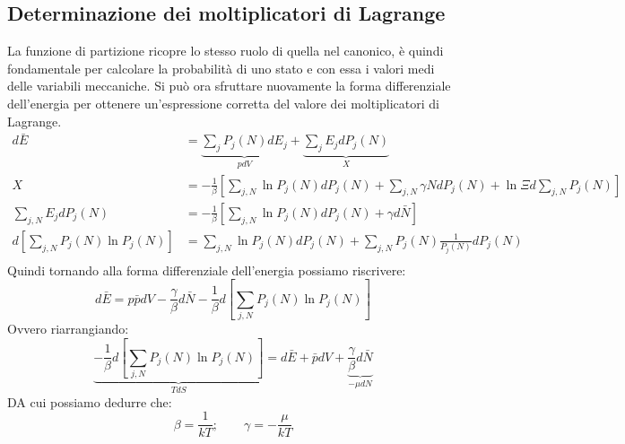 \documentclass[oneside]{amsbook}
\numberwithin{section}{chapter}
\numberwithin{equation}{section}
\numberwithin{figure}{section}
\begin{document}
\subsection{Determinazione dei moltiplicatori di Lagrange}
La funzione di partizione ricopre lo stesso ruolo di quella nel canonico, è quindi fondamentale per calcolare la probabilità di uno stato e con essa i valori medi delle variabili meccaniche.
Si può ora sfruttare nuovamente la forma differenziale dell'energia per ottenere un'espressione corretta del valore dei moltiplicatori di Lagrange. 
\begin{equation}
\begin{aligned}
d\bar{E} &= \underbrace{\sum_j P_j (N) dE_j}_{pdV}+\underbrace{\sum_j E_j dP_j(N)}_{X} \\
X&= -\frac{1}{\beta}\left[ \sum_{j,N} \ln P_j(N)dP_j(N) + \sum_{j,N}\gamma N d P_j(N) + \ln \Xi d \sum_{j,N}P_j (N)\right] \\
\sum_{j,N} E_j dP_j (N) &=-\frac{1}{\beta}\left[ \sum_{j,N} \ln P_j(N)dP_j(N) + \gamma  d \bar{N}\right]\\
d\left[ \sum_{j,N}P_j(N) \ln P_j(N)\right]&= \sum_{j,N} \ln P_j(N)dP_j(N) + \sum_{j,N}P_j(N)\frac{1}{P_j(N)} dP_j(N)\\
\end{aligned}
\end{equation}
Quindi tornando alla forma differenziale dell'energia possiamo riscrivere:
\begin{equation}
d\bar{E }= p\bar{p}dV-\frac{\gamma}{\beta}d\bar{N }- \frac{1}{\beta} d \left[ \sum_{j,N}P_j(N) \ln P_j(N)\right]
\end{equation}
Ovvero riarrangiando:
\begin{equation}
\underbrace{- \frac{1}{\beta} d \left[ \sum_{j,N}P_j(N) \ln P_j(N)\right]}_{TdS}=d\bar{E}+\bar{p}dV+\underbrace{\frac{\gamma}{\beta}d\bar{N}}_{-\mu dN}
\end{equation}
DA cui possiamo dedurre che:
\begin{equation}
\beta=\frac{1}{kT};\quad \quad \gamma= -\frac{\mu}{kT}
\end{equation}
\end{document}
